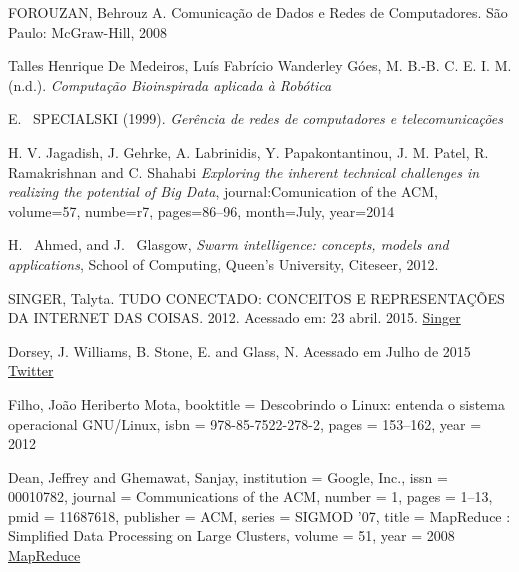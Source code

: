 \documentclass[conference,compsoc]{IEEEtran}
\begin{document}
%
%
%
\begin{thebibliography}{1}

FOROUZAN, Behrouz A. Comunicação de Dados e Redes de Computadores. São Paulo: McGraw-Hill, 2008

Talles Henrique De Medeiros, Luís Fabrício Wanderley Góes, M. B.-B. C. E. I. M. (n.d.). 
\emph{Computação Bioinspirada aplicada à Robótica}

E. ~SPECIALSKI (1999).
\emph{Gerência de redes de computadores e telecomunicações}

  H. V. Jagadish, J. Gehrke, A. Labrinidis, Y. Papakontantinou, J. M. Patel, R. Ramakrishnan and C. Shahabi
  \emph{Exploring the inherent technical challenges in realizing the potential of Big Data},
  journal:Comunication of the ACM, volume=57, numbe=r7, pages=86--96, month=July, year=2014

H. ~Ahmed, and J. ~Glasgow,
\emph{Swarm intelligence: concepts, models and applications},
\relax School of Computing, Queen's University, Citeseer, 2012.

SINGER, Talyta. TUDO CONECTADO: CONCEITOS E REPRESENTAÇÕES DA INTERNET DAS COISAS. 2012.
Acessado em: 23 abril. 2015.
\href{http://www.simsocial2012.ufba.br/modulos/submissao/Upload/44965.pdf} {Singer}

Dorsey, J. Williams, B. Stone, E. and Glass, N.
Acessado em Julho de 2015
\href {https://pt.wikipedia.org/wiki/Twitter}
{Twitter}

Filho, João Heriberto Mota,
booktitle = {Descobrindo o Linux: entenda o sistema operacional GNU/Linux},
isbn = {978-85-7522-278-2},
pages = {153--162},
year = {2012}

Dean, Jeffrey and Ghemawat, Sanjay,
institution = {Google, Inc.},
issn = {00010782},
journal = {Communications of the ACM},
number = {1},
pages = {1--13},
pmid = {11687618},
publisher = {ACM},
series = {SIGMOD '07},
title = {{MapReduce : Simplified Data Processing on Large Clusters}},
volume = {51},
year = {2008}
\href{http://portal.acm.org/citation.cfm?id=1327492}{MapReduce}



\end{thebibliography}
\end{document}
